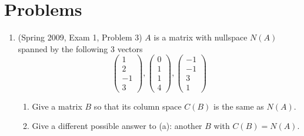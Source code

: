 \documentclass[11pt]{article}
\begin{document}


\section{Problems}

\begin{enumerate}

\item (Spring 2009, Exam 1, Problem 3)  $A$ is a matrix with nullspace $N(A)$ spanned by the following $3$ vectors
\[\begin{pmatrix} 1 \\ 2 \\ -1 \\ 3 \end{pmatrix}, \begin{pmatrix} 0 \\ 1 \\ 1 \\ 4 \end{pmatrix},\begin{pmatrix} -1 \\ -1 \\ 3 \\ 1 \end{pmatrix}\]
\begin{enumerate}

\item Give a matrix $B$ so that its column space $C(B)$ is the same as $N(A)$.

\item Give a different possible answer to (a): another $B$ with $C(B) = N(A)$.


\end{enumerate}
\end{enumerate}
\end{document}
